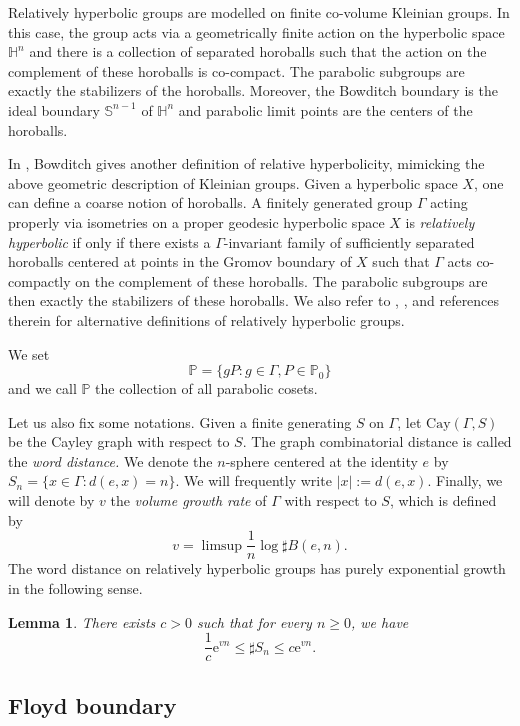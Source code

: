 \documentclass{amsart}
\newtheorem{lem}[thm]{Lemma}
\theoremstyle{definition}
\theoremstyle{remark}
\newcommand{\Gx }{\mathrm{Cay}(\Gamma, S)}
\begin{document}
Relatively hyperbolic groups are modelled on finite co-volume Kleinian groups.
In this case, the group acts via a geometrically finite action on the hyperbolic space $\mathbb H^n$ and there is a collection of separated horoballs such that the action on the complement of these horoballs is co-compact.
The parabolic subgroups are exactly the stabilizers of the horoballs.
Moreover, the Bowditch boundary is the ideal boundary $\mathbb S^{n-1}$ of $\mathbb H^n$ and parabolic limit points are the centers of the horoballs.

In \cite{Bowditch}, Bowditch gives another definition of relative hyperbolicity, mimicking the above geometric description of Kleinian groups.
Given a hyperbolic space $X$, one can define a coarse notion of horoballs.
A finitely generated group $\Gamma$ acting properly via isometries on a proper geodesic hyperbolic space $X$ is \textit{relatively hyperbolic} if only if there exists a $\Gamma$-invariant family of sufficiently separated horoballs centered at points in the Gromov boundary of $X$ such that $\Gamma$ acts co-compactly on the complement of these horoballs.
The parabolic subgroups are then exactly the stabilizers of these horoballs.
We also refer to \cite{Osin}, \cite{Farb}, \cite{DrutuSapir} and references therein for alternative definitions of relatively hyperbolic groups.

We set
$$\mathbb P=\{gP: g\in \Gamma, P\in\mathbb P_0\}$$ 
and we call $\mathbb P$ the collection of all parabolic cosets.

 Let us also fix some notations.
Given a finite generating $S$ on $\Gamma$, let $\Gx$ be the Cayley graph with respect to $S$.
The graph combinatorial distance is called the \textit{word distance.}
We denote the $n$-sphere centered at the identity $e$ by
$S_n=\{x\in \Gamma: d(e, x)=n\}$.
We will frequently write $|x|:=d(e,x)$. 
Finally, we will denote by $v$ the \textit{volume growth rate} of $\Gamma$ with respect to $S$, which is defined by
$$v=\limsup \frac{1}{n}\log \sharp B(e,n).$$
The word distance on relatively hyperbolic groups has purely exponential growth in the following sense.

\begin{lem}\label{purelyexponentialgrowth}\cite[Theorem 1.9]{YangPS}
There exists $c>0$ such that for every $n\geq0$, we have
$$\frac{1}{c}\mathrm{e}^{vn}\leq \sharp S_n\leq c \mathrm{e}^{vn}.$$
\end{lem}

\subsection{Floyd boundary}\label{SectionFloydboundary} 
 
\end{document}
